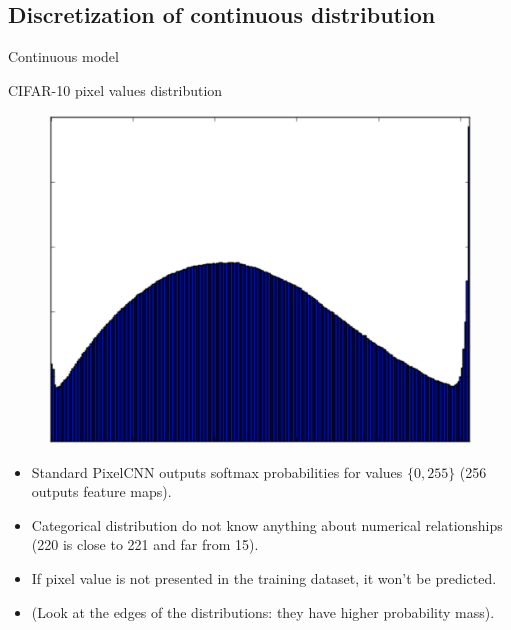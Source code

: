 \subsection{Discretization of continuous distribution}
\begin{frame}{Continuous model}
	\begin{block}{CIFAR-10 pixel values distribution}
		\begin{figure}
			\includegraphics[width=0.3\linewidth]{figs/pixelcnn++_pixels_distr}
		\end{figure}
	\end{block}
	\vspace{-0.5cm}
	\begin{itemize}
		\item Standard PixelCNN outputs softmax probabilities for values $\{0, 255\}$ (256 outputs feature maps). 
		\item Categorical distribution do not know anything about numerical relationships (220 is close to 221 and far from 15).
		\item If pixel value is not presented in the training dataset, it won't be predicted.
		\item (Look at the edges of the distributions: they have higher probability mass).
	\end{itemize}
\end{frame}
